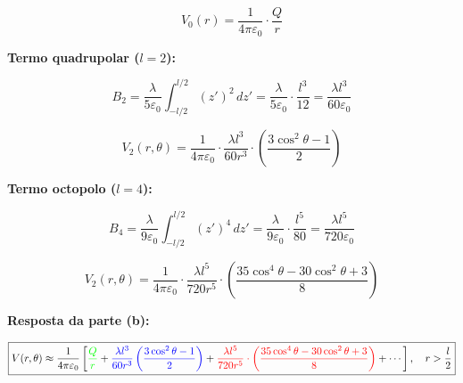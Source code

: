\documentclass[a4paper,12pt]{article}
\begin{document}
\begin{flushleft}
\begin{equation}
V_0(r) = \frac{1}{4\pi\varepsilon_0} \cdot \frac{Q}{r}
\end{equation}

\vspace{0.3cm}
\noindent
\colorbox{blue!15}{\textbf{Termo quadrupolar (\( l = 2 \)):}}

\begin{equation}
B_2 = \frac{\lambda}{5\varepsilon_0} \int_{-l/2}^{l/2} (z')^2 \, dz' = \frac{\lambda}{5\varepsilon_0} \cdot \frac{l^3}{12}
= \frac{\lambda l^3}{60\varepsilon_0}
\end{equation}

\begin{equation}
V_2(r, \theta) = \frac{1}{4\pi\varepsilon_0} \cdot \frac{\lambda l^3}{60 r^3} \cdot \left( \frac{3\cos^2\theta - 1}{2} \right)
\end{equation}

\vspace{0.3cm}
\noindent
\colorbox{red!15}{\textbf{Termo octopolo (\( l = 4 \)):}}

\begin{equation}
B_4 = \frac{\lambda}{9\varepsilon_0} \int_{-l/2}^{l/2} (z')^4 \, dz' = \frac{\lambda}{9\varepsilon_0} \cdot \frac{l^5}{80}
= \frac{\lambda l^5}{720\varepsilon_0}
\end{equation}

\begin{equation}
V_2(r, \theta) = \frac{1}{4\pi\varepsilon_0} \cdot \frac{\lambda l^5}{720 r^5} \cdot \left( \frac{35\cos^4\theta - 30\cos^2\theta + 3}{8} \right)
\end{equation}


\vspace{0.3cm}
\noindent
\textbf{Resposta da parte (b):}

\begin{equation}
\boxed{
V(r, \theta) \approx \frac{1}{4\pi\varepsilon_0} \left[
\textcolor{green}{\frac{Q}{r}} +
\textcolor{blue}{\frac{\lambda l^3}{60 r^3} \left( \frac{3\cos^2\theta - 1}{2} \right)}
+ \textcolor{red}{\frac{\lambda l^5}{720 r^5} \cdot \left( \frac{35\cos^4\theta - 30\cos^2\theta + 3}{8} \right)}
+ \cdots
\right]
,\quad r > \frac{l}{2}
}
\end{equation}

\end{flushleft}
\end{document}
